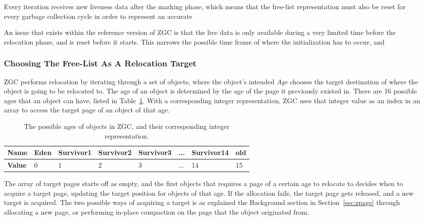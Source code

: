 Every iteration receives new liveness data after the marking phase, which means that the free-list representation must also be reset for every garbage collection cycle in order to represent an accurate 

An issue that exists within the reference version of ZGC is that the live data is only available during a very limited time before the relocation phase, and is reset before it starts. This narrows the possible time frame of where the initialization has to occur, and  

\subsubsection{Choosing The Free-List As A Relocation Target}
\label{sec:analyse-use}

ZGC performs relocation by iterating through a set of objects, where the object's intended \textit{Age} chooses the target destination of where the object is going to be relocated to. The age of an object is determined by the age of the page it previously existed in. There are 16 possible ages that an object can have, listed in Table~\ref{table:zpage_ages}. With a corresponding integer representation, ZGC uses that integer value as an index in an array to access the target page of an object of that age. 

\begin{table}[H]
    \centering
    \begin{tabular}{|l|l|l|l|l|l|l|l|}
        \hline
        \textbf{Name} & Eden & Survivor1 & Survivor2 & Survivor3 & ... & Survivor14 & old \\ \hline
        \textbf{Value} & 0 & 1 & 2 & 3 & ... & 14 & 15 \\ \hline
    \end{tabular}
    \caption{The possible ages of objects in ZGC, and their corresponding integer representation.}
    \label{table:zpage_ages}
\end{table}

The array of target pages starts off as empty, and the first objects that requires a page of a certain age to relocate to decides when to acquire a target page, updating the target position for objects of that age. If the allocation fails, the target page gets released, and a new target is acquired. The two possible ways of acquiring a target is as explained the Background section in Section~\ref*{sec:zpage} through allocating a new page, or performing in-place compaction on the page that the object originated from.

